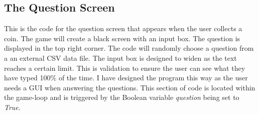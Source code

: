 \documentclass[12pt]{report}
\begin{document}
\pagebreak

\normalsize
\subsection{The Question Screen}
This is the code for the question screen that appears when the user collects a coin. The game will create a black screen with an input box. The question is displayed in the top right corner. The code will randomly choose a question from a an external CSV data file. The input box is designed to widen as the text reaches a certain limit. This is validation to ensure the user can see what they have typed 100\% of the time. I have designed the program this way as the user needs a GUI when answering the questions. This section of code is located within the game-loop and is triggered by the Boolean variable \textit{question} being set to \textit{True}. 
\end{document}
